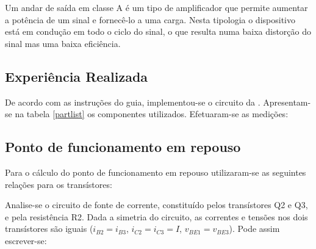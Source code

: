 \documentclass[%
  reprint,
  nofootinbib,
  amsmath,amssymb,
  aps,
  10pt,
  a4paper
]{revtex4-1}
\begin{document}
Um andar de saída em classe A é um tipo de amplificador que permite aumentar a potência de um sinal e fornecê-lo a uma carga. Nesta tipologia o dispositivo está em condução em todo o ciclo do sinal, o que resulta numa baixa distorção do sinal mas uma baixa eficiência.


\subsection{Experiência Realizada}
\label{s:expreal}
De acordo com as instruções do guia, implementou-se o circuito da . Apresentam-se na tabela \ref{partlist} os componentes utilizados.
Efetuaram-se as medições:




\subsection{Ponto de funcionamento em repouso}
Para o cálculo do ponto de funcionamento em repouso utilizaram-se as seguintes relações para os transístores:

Analise-se o circuito de fonte de corrente, constituído pelos transístores Q2 e Q3, e pela resistência R2. Dada a simetria do circuito, as correntes e tensões nos dois transístores são iguais ($i_{B2}=i_{B3}$, $i_{C2}=i_{C3}=I$, $v_{BE1}=v_{BE3}$). Pode assim escrever-se:
\end{document}
